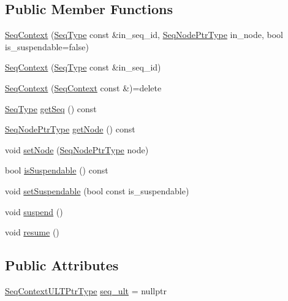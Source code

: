 \subsection*{Public Member Functions}
\begin{DoxyCompactItemize}
\item 
\hyperlink{structvt_1_1seq_1_1_seq_context_a3f994bf7ead90f03320b94bc2797039b}{Seq\+Context} (\hyperlink{namespacevt_1_1seq_a3b612da217ac669d39c159f134ab8434}{Seq\+Type} const \&in\+\_\+seq\+\_\+id, \hyperlink{namespacevt_1_1seq_ae6a4874b585be0612aaca32ca6d2d191}{Seq\+Node\+Ptr\+Type} in\+\_\+node, bool is\+\_\+suspendable=false)
\item 
\hyperlink{structvt_1_1seq_1_1_seq_context_a797189d52bbfd7eb2f776119068461bd}{Seq\+Context} (\hyperlink{namespacevt_1_1seq_a3b612da217ac669d39c159f134ab8434}{Seq\+Type} const \&in\+\_\+seq\+\_\+id)
\item 
\hyperlink{structvt_1_1seq_1_1_seq_context_a296fda6917a2f69772f8f1b9faceeadb}{Seq\+Context} (\hyperlink{structvt_1_1seq_1_1_seq_context}{Seq\+Context} const \&)=delete
\item 
\hyperlink{namespacevt_1_1seq_a3b612da217ac669d39c159f134ab8434}{Seq\+Type} \hyperlink{structvt_1_1seq_1_1_seq_context_a24fb30ec00c71ae6ae51ba6931957f2a}{get\+Seq} () const
\item 
\hyperlink{namespacevt_1_1seq_ae6a4874b585be0612aaca32ca6d2d191}{Seq\+Node\+Ptr\+Type} \hyperlink{structvt_1_1seq_1_1_seq_context_a9fd5265c51699de8e5a33e297333bd45}{get\+Node} () const
\item 
void \hyperlink{structvt_1_1seq_1_1_seq_context_a90e58dfc548cdcfa05665588f6ef4a5a}{set\+Node} (\hyperlink{namespacevt_1_1seq_ae6a4874b585be0612aaca32ca6d2d191}{Seq\+Node\+Ptr\+Type} node)
\item 
bool \hyperlink{structvt_1_1seq_1_1_seq_context_a5ad2faf1024f75aee49020194022a831}{is\+Suspendable} () const
\item 
void \hyperlink{structvt_1_1seq_1_1_seq_context_a92465215f2a9331e305dd0cf8306bf28}{set\+Suspendable} (bool const is\+\_\+suspendable)
\item 
void \hyperlink{structvt_1_1seq_1_1_seq_context_af53636e2ee35cc96e203e738f9e118b3}{suspend} ()
\item 
void \hyperlink{structvt_1_1seq_1_1_seq_context_ae46197afa12567c6a068c0cd4ec92be9}{resume} ()
\end{DoxyCompactItemize}
\subsection*{Public Attributes}
\begin{DoxyCompactItemize}
\item 
\hyperlink{structvt_1_1seq_1_1_seq_context_a7e5dc3958df8473c5bcd938f0f2cf933}{Seq\+Context\+U\+L\+T\+Ptr\+Type} \hyperlink{structvt_1_1seq_1_1_seq_context_a8b90e0946bbef6e744a1030699b047ef}{seq\+\_\+ult} = nullptr
\end{DoxyCompactItemize}


